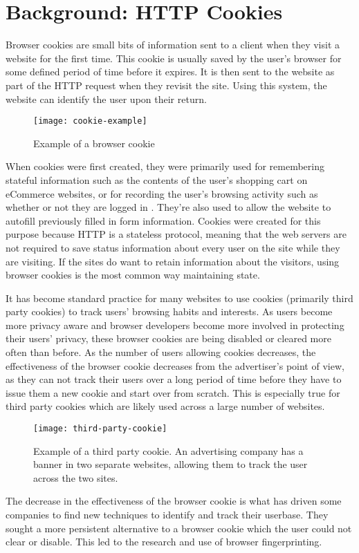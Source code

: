 \chapter{Background: HTTP Cookies}

Browser cookies are small bits of information sent to a client when they visit a website for the first time.
This cookie is usually saved by the user's browser for some defined period of time before it expires.
It is then sent to the website as part of the HTTP request when they revisit the site.
Using this system, the website can identify the user upon their return.

\begin{figure}[h]
\texttt{[image: cookie-example]}
\centering
\caption{Example of a browser cookie}
\end{figure}

When cookies were first created, they were primarily used for remembering stateful information such as the contents of the user's shopping cart on eCommerce websites, or for recording the user's browsing activity such as whether or not they are logged in \citep{cookiesbackground}.
They're also used to allow the website to autofill previously filled in form information.
Cookies were created for this purpose because HTTP is a stateless protocol, meaning that the web servers are not required to save status information about every user on the site while they are visiting.
If the sites do want to retain information about the visitors, using browser cookies is the most common way maintaining state.

It has become standard practice for many websites to use cookies (primarily third party cookies) to track users' browsing habits and interests.
As users become more privacy aware and browser developers become more involved in protecting their users' privacy, these browser cookies are being disabled or cleared more often than before.
As the number of users allowing cookies decreases, the effectiveness of the browser cookie decreases from the advertiser's point of view, as they can not track their users over a long period of time before they have to issue them a new cookie and start over from scratch.
This is especially true for third party cookies which are likely used across a large number of websites.

\begin{figure}[h]
\texttt{[image: third-party-cookie]}
\centering
\caption{Example of a third party cookie.
An advertising company has a banner in two separate websites, allowing them to track the user across the two sites.}
\end{figure}

The decrease in the effectiveness of the browser cookie is what has driven some companies to find new techniques to identify and track their userbase.
They sought a more persistent alternative to a browser cookie which the user could not clear or disable.
This led to the research and use of browser fingerprinting.

